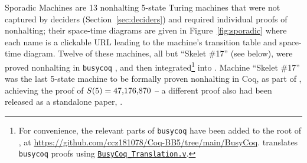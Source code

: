 Sporadic Machines are 13 nonhalting 5-state Turing machines that were not captured by deciders (Section~\ref{sec:deciders}) and required individual \Coq proofs of nonhalting; their space-time diagrams are given in Figure~\ref{fig:sporadic} where each name is a clickable URL leading to the machine's transition table and space-time diagram. Twelve of these machines, \ie all but ``Skelet \#17'' (see below), were proved nonhalting in \texttt{busycoq} \cite{busycoq}, and then integrated\footnote{For convenience, the relevant parts of \texttt{busycoq} have been added to the root of \CoqBB, at \url{https://github.com/ccz181078/Coq-BB5/tree/main/BusyCoq}. \CoqBB translates \texttt{busycoq} proofs using \href{https://github.com/ccz181078/Coq-BB5/blob/main/CoqBB5/BB5/BusyCoq_Translation.v}{\texttt{BusyCoq\_Translation.v}}.} into \CoqBB. Machine ``Skelet \#17'' was the last 5-state machine to be formally proven nonhalting in Coq, as part of \CoqBB, achieving the proof of $S(5) = 47{,}176{,}870$ -- a different proof also had been released as a standalone paper, \cite{xu2024skelet17fifthbusy}.

